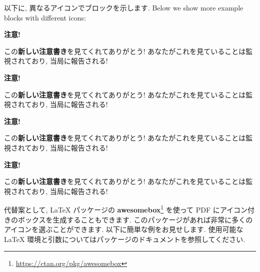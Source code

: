 \documentclass[
  11pt,
]{bxjsreport}
\renewcommand{\href}[2]{#2\footnote{\url{#1}}}
\newenvironment{blackbox}{
  \definecolor{shadecolor}{rgb}{0, 0, 0}  %
  \color{white}
  \begin{shaded}}
 {\end{shaded}}
\newenvironment{infobox}[1]
  {
  \begin{itemize}
  \renewcommand{\labelitemi}{
    \raisebox{-.7\height}[0pt][0pt]{
      {\setkeys{Gin}{width=3em,keepaspectratio}
        \texttt{[image: images/\#1]}}
    }
  }
  \setlength{\fboxsep}{1em}
  \begin{blackbox}
  \item
  }
  {
  \end{blackbox}
  \end{itemize}
  }
\begin{document}
以下に, 異なるアイコンでブロックを示します. Below we show more example blocks with different icons:

\begin{infobox}{warning}
\textbf{注意!}

この\textbf{新しい注意書き}を見てくれてありがとう! あなたがこれを見ていることは監視されており, 当局に報告される!

\end{infobox}

\begin{infobox}{note}
\textbf{注意!}

この\textbf{新しい注意書き}を見てくれてありがとう! あなたがこれを見ていることは監視されており, 当局に報告される!

\end{infobox}

\begin{infobox}{important}
\textbf{注意!}

この\textbf{新しい注意書き}を見てくれてありがとう! あなたがこれを見ていることは監視されており, 当局に報告される!

\end{infobox}

\begin{infobox}{tip}
\textbf{注意!}

この\textbf{新しい注意書き}を見てくれてありがとう! あなたがこれを見ていることは監視されており, 当局に報告される!

\end{infobox}

代替案として, LaTeX パッケージの \href{https://ctan.org/pkg/awesomebox}{\textbf{awesomebox}} を使って PDF にアイコン付きのボックスを生成することもできます. このパッケージがあれば非常に多くのアイコンを選ぶことができます. 以下に簡単な例をお見せします. 使用可能な LaTeX 環境と引数についてはパッケージのドキュメントを参照してください.
\end{document}
